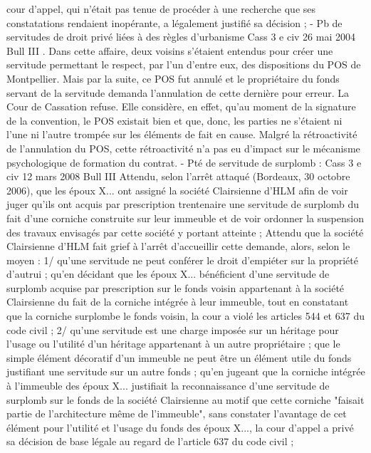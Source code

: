 \documentclass[11pt,a4paper]{report}
\begin{document}
	cour d'appel, qui n'était pas tenue de procéder à une recherche que ses constatations rendaient inopérante, a
	légalement justifié sa décision ;
	- Pb de servitudes de droit privé liées à des règles d’urbanisme
	Cass 3 e civ 26 mai 2004 Bull III . Dans cette affaire, deux voisins s’étaient entendus pour créer une
	servitude permettant le respect, par l’un d’entre eux, des dispositions du POS de Montpellier. Mais par la suite,
	ce POS fut annulé et le propriétaire du fonds servant de la servitude demanda l’annulation de cette dernière pour
	erreur. La Cour de Cassation refuse. Elle considère, en effet, qu’au moment de la signature de la convention, le
	POS existait bien et que, donc, les parties ne s’étaient ni l’une ni l’autre trompée sur les éléments de fait en
	cause. Malgré la rétroactivité de l’annulation du POS, cette rétroactivité n’a pas eu d’impact sur le mécanisme
	psychologique de formation du contrat.
	- Pté de servitude de surplomb :
	Cass 3 e civ 12 mars 2008 Bull III 
	Attendu, selon l'arrêt attaqué (Bordeaux, 30 octobre 2006), que les époux X... ont assigné la société Clairsienne
	d'HLM afin de voir juger qu'ils ont acquis par prescription trentenaire une servitude de surplomb du fait d'une
	corniche construite sur leur immeuble et de voir ordonner la suspension des travaux envisagés par cette société
	y portant atteinte ;
	Attendu que la société Clairsienne d'HLM fait grief à l'arrêt d'accueillir cette demande, alors, selon le moyen :
	1\degre / qu'une servitude ne peut conférer le droit d'empiéter sur la propriété d'autrui ; qu'en décidant que les époux
	X... bénéficient d'une servitude de surplomb acquise par prescription sur le fonds voisin appartenant à la société
	Clairsienne du fait de la corniche intégrée à leur immeuble, tout en constatant que la corniche surplombe le
	fonds voisin, la cour a violé les articles 544 et 637 du code civil ;
	2\degre / qu'une servitude est une charge imposée sur un héritage pour l'usage ou l'utilité d'un héritage appartenant à
	un autre propriétaire ; que le simple élément décoratif d'un immeuble ne peut être un élément utile du fonds
	justifiant une servitude sur un autre fonds ; qu'en jugeant que la corniche intégrée à l'immeuble des époux X...
	justifiait la reconnaissance d'une servitude de surplomb sur le fonds de la société Clairsienne au motif que cette
	corniche "faisait partie de l'architecture même de l'immeuble", sans constater l'avantage de cet élément pour
	l'utilité et l'usage du fonds des époux X..., la cour d'appel a privé sa décision de base légale au regard de
	l'article 637 du code civil ;
\end{document}
